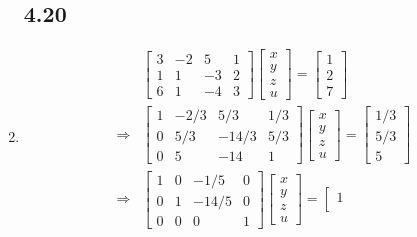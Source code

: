 \documentclass[a4paper, 12pt]{article}
\begin{document}
\begin{enumerate}
		\subsection*{4.20}
		\setcounter{enumi}{4}
		\item \begin{align*}
		&\left[ \begin{array}{cccc}
		3 & -2 & 5 & 1 \\
		1 & 1 & -3 & 2 \\
		6 & 1 & -4 & 3 \end{array} \right]
		\left[ \begin{array}{c}
		x \\
		y \\
		z \\
		u \end{array} \right]
		= \left[ \begin{array}{c}
		1 \\
		2 \\
		7 \end{array} \right] \\
		\Rightarrow &\left[ \begin{array}{cccc}
		1 & -2/3 & 5/3 & 1/3 \\
		0 & 5/3 & -14/3 & 5/3 \\
		0 & 5 & -14 & 1 \end{array} \right]
		\left[ \begin{array}{c}
		x \\
		y \\
		z \\
		u \end{array} \right]
		= \left[ \begin{array}{c}
		1/3 \\
		5/3 \\
		5 \end{array} \right] \\
		\Rightarrow &\left[ \begin{array}{cccc}
		1 & 0 & -1/5 & 0 \\
		0 & 1 & -14/5 & 0 \\
		0 & 0 & 0 & 1 \end{array} \right]
		\left[ \begin{array}{c}
		x \\
		y \\
		z \\
		u \end{array} \right]
		= \left[ \begin{array}{c}
		1 \\

\end{array}
\end{align*}
\end{enumerate}
\end{document}
